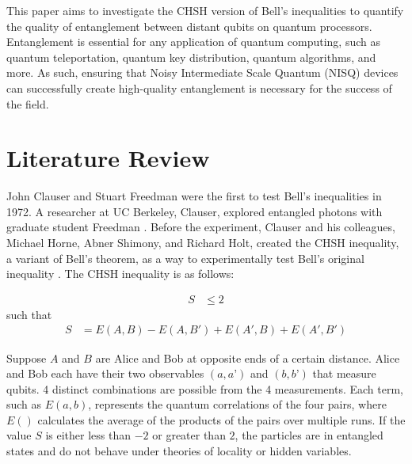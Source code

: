 \documentclass[a4paper, onecolumn, 11pt, titlepage]{quantumarticle}
\begin{document}
This paper aims to investigate the CHSH version of Bell's inequalities to quantify the quality of entanglement between distant qubits on quantum processors. Entanglement is essential for any application of quantum computing, such as quantum teleportation, quantum key distribution, quantum algorithms, and more. As such, ensuring that Noisy Intermediate Scale Quantum (NISQ) devices can successfully create high-quality entanglement is necessary for the success of the field. 

\section{Literature Review}

John Clauser and Stuart Freedman were the first to test Bell’s inequalities in 1972. A researcher at UC Berkeley, Clauser, explored entangled photons with graduate student Freedman \cite{PhysRevLett.28.938}. Before the experiment, Clauser and his colleagues, Michael Horne, Abner Shimony, and Richard Holt, created the CHSH inequality, a variant of Bell’s theorem, as a way to experimentally test Bell’s original inequality \cite{PhysRevLett.23.880}. The CHSH inequality is as follows:

\begin{equation} \label{eq1}
\begin{split}
    S & \leq 2
\end{split}
\end{equation}
such that 
\begin{equation} \label{eq2}
\begin{split}
    S & = E(A,B) - E(A, B') +E(A', B) + E(A', B')
\end{split}
\end{equation}

Suppose $A$ and $B$ are Alice and Bob at opposite ends of a certain distance. Alice and Bob each have their two observables $(a, a’)$ and $(b, b’)$ that measure qubits. 4 distinct combinations are possible from the 4 measurements. Each term, such as $E(a,b)$, represents the quantum correlations of the four pairs, where $E()$ calculates the average of the products of the pairs over multiple runs. If the value $S$ is either less than $-2$ or greater than $2$, the particles are in entangled states and do not behave under theories of locality or hidden variables. 
\end{document}
